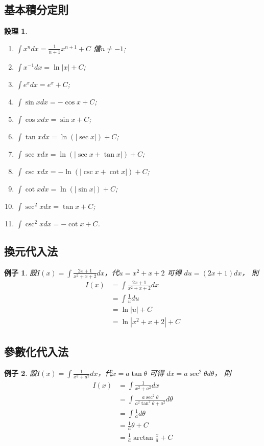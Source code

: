\documentclass[12pt]{article}
\newtheorem*{proposition}{設理}
\newtheorem*{example}{例子}
\begin{document}
    \subsection*{基本積分定則}
    \begin{proposition}
        \begin{enumerate}
            \item $\int x^n dx = \frac{1}{n+1}x^{n+1} + C$ 儅$n\neq -1$;
            \item $\int x^{-1} dx = \ln{|x|} + C$;
            \item $\int e^x dx = e^x + C$;
            \item $\int \sin{x} dx = -\cos{x} + C$;
            \item $\int \cos{x} dx = \sin{x} + C$;
            \item $\int \tan{x} dx = \ln(|\sec{x}|) + C$;
            \item $\int \sec{x} dx = \ln(|\sec{x}+\tan{x}|) + C$;
            \item $\int \csc{x} dx = -\ln(|\csc{x}+\cot{x}|) + C$;
            \item $\int \cot{x} dx = \ln(|\sin{x}|) + C$;
            \item $\int \sec^2{x} dx = \tan{x} + C$;
            \item $\int \csc^2{x} dx = -\cot{x} + C$.
        \end{enumerate}
    \end{proposition}
    \subsection*{換元代入法}
    \begin{example}
        設$I(x)=\int \frac{2x+1}{x^2+x+2} dx$，代$u=x^2+x+2$ 可得 $du = (2x+1) dx$， 則\begin{align*}
            I(x)&=\int \frac{2x+1}{x^2+x+2} dx\\
            &=\int \frac{1}{u} du\\
            &=\ln|u|+C\\
            &=\ln|x^2+x+2|+C
        \end{align*}
    \end{example}
    \subsection*{參數化代入法}
    \begin{example}
        設$I(x)=\int \frac{1}{x^2+a^2} dx$，代$x=a\tan{\theta}$ 可得 $dx = a\sec^2{\theta} d\theta$， 則\begin{align*}
            I(x)&=\int \frac{1}{x^2+a^2} dx\\
            &=\int \frac{a\sec^2{\theta}}{a^2\tan^2{\theta}+a^2} d\theta\\
            &=\int \frac{1}{a} d\theta\\
            &=\frac{1}{a}\theta + C\\
            &=\frac{1}{a}\arctan{\frac{x}{a}} + C
        \end{align*}
    \end{example}
\end{document}
